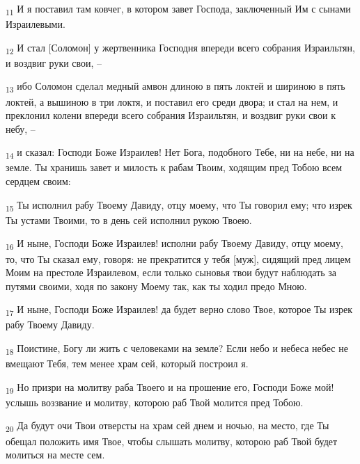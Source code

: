 \begin{tcolorbox}
\textsubscript{11} И я поставил там ковчег, в котором завет Господа, заключенный Им с сынами Израилевыми.
\end{tcolorbox}
\begin{tcolorbox}
\textsubscript{12} И стал [Соломон] у жертвенника Господня впереди всего собрания Израильтян, и воздвиг руки свои, --
\end{tcolorbox}
\begin{tcolorbox}
\textsubscript{13} ибо Соломон сделал медный амвон длиною в пять локтей и шириною в пять локтей, а вышиною в три локтя, и поставил его среди двора; и стал на нем, и преклонил колени впереди всего собрания Израильтян, и воздвиг руки свои к небу, --
\end{tcolorbox}
\begin{tcolorbox}
\textsubscript{14} и сказал: Господи Боже Израилев! Нет Бога, подобного Тебе, ни на небе, ни на земле. Ты хранишь завет и милость к рабам Твоим, ходящим пред Тобою всем сердцем своим:
\end{tcolorbox}
\begin{tcolorbox}
\textsubscript{15} Ты исполнил рабу Твоему Давиду, отцу моему, что Ты говорил ему; что изрек Ты устами Твоими, то в день сей исполнил рукою Твоею.
\end{tcolorbox}
\begin{tcolorbox}
\textsubscript{16} И ныне, Господи Боже Израилев! исполни рабу Твоему Давиду, отцу моему, то, что Ты сказал ему, говоря: не прекратится у тебя [муж], сидящий пред лицем Моим на престоле Израилевом, если только сыновья твои будут наблюдать за путями своими, ходя по закону Моему так, как ты ходил предо Мною.
\end{tcolorbox}
\begin{tcolorbox}
\textsubscript{17} И ныне, Господи Боже Израилев! да будет верно слово Твое, которое Ты изрек рабу Твоему Давиду.
\end{tcolorbox}
\begin{tcolorbox}
\textsubscript{18} Поистине, Богу ли жить с человеками на земле? Если небо и небеса небес не вмещают Тебя, тем менее храм сей, который построил я.
\end{tcolorbox}
\begin{tcolorbox}
\textsubscript{19} Но призри на молитву раба Твоего и на прошение его, Господи Боже мой! услышь воззвание и молитву, которою раб Твой молится пред Тобою.
\end{tcolorbox}
\begin{tcolorbox}
\textsubscript{20} Да будут очи Твои отверсты на храм сей днем и ночью, на место, где Ты обещал положить имя Твое, чтобы слышать молитву, которою раб Твой будет молиться на месте сем.
\end{tcolorbox}
